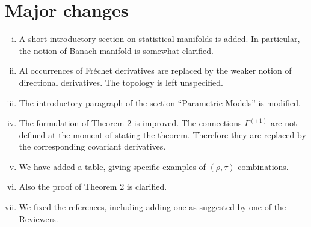 \documentclass[a4paper,12pt]{article}
\begin{document}
\section{Major changes}

\begin{enumerate}[(i)]

 \item  A short introductory section on statistical manifolds is added.
In particular, the notion of Banach manifold is somewhat clarified.

 \item Al occurrences of Fr\'echet derivatives are replaced by the weaker notion
of directional derivatives. The topology is left unspecified.

 \item The introductory paragraph of the section ``Parametric Models'' is modified.

 \item The formulation of Theorem 2 is improved. The connections $\Gamma^{(\pm 1)}$ are not defined
at the moment of stating the theorem.
Therefore they are replaced by the corresponding covariant derivatives.

\item We have added a table, giving specific examples of $(\rho, \tau)$ combinations.

 \item Also the proof of Theorem 2 is clarified.

 \item We fixed the references, including adding one as suggested by one of the Reviewers.


\end{enumerate}
\end{document}
